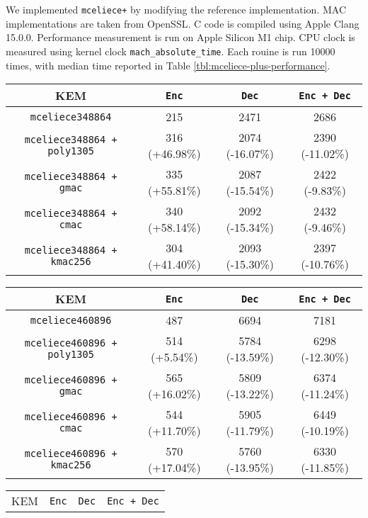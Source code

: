 \documentclass[runningheads]{llncs}
\begin{document}
We implemented \texttt{mceliece+} by modifying the reference implementation. MAC implementations are taken from OpenSSL. C code is compiled using Apple Clang 15.0.0. Performance measurement is run on Apple Silicon M1 chip. CPU clock is measured using kernel clock \texttt{mach\_absolute\_time}. Each rouine is run 10000 times, with median time reported in Table \ref{tbl:mceliece-plus-performance}.

\begin{table}[h]
    \centering
    \begin{tabular}[c]{|c|c|c|c|}
        \hline
        KEM & \texttt{Enc} & \texttt{Dec} & \texttt{Enc + Dec} \\
        \hline
        \texttt{mceliece348864} & 215 & 2471 & 2686 \\
        \hline
        \texttt{mceliece348864 + poly1305} & 316 (+46.98\%) & 2074 (-16.07\%) & 2390 (-11.02\%) \\
        \hline
        \texttt{mceliece348864 + gmac} & 335 (+55.81\%) & 2087 (-15.54\%) & 2422 (-9.83\%) \\
        \hline
        \texttt{mceliece348864 + cmac} & 340 (+58.14\%) & 2092 (-15.34\%) & 2432 (-9.46\%) \\
        \hline
        \texttt{mceliece348864 + kmac256} & 304 (+41.40\%) & 2093 (-15.30\%) & 2397 (-10.76\%) \\
        \hline
    \end{tabular}
    \begin{tabular}[c]{|c|c|c|c|}
        \hline
        KEM & \texttt{Enc} & \texttt{Dec} & \texttt{Enc + Dec} \\
        \hline
        \texttt{mceliece460896} & 487 & 6694 & 7181 \\
        \hline
        \texttt{mceliece460896 + poly1305} & 514 (+5.54\%) & 5784 (-13.59\%) & 6298 (-12.30\%) \\
        \hline
        \texttt{mceliece460896 + gmac} & 565 (+16.02\%) & 5809 (-13.22\%) & 6374 (-11.24\%) \\
        \hline
        \texttt{mceliece460896 + cmac} & 544 (+11.70\%) & 5905 (-11.79\%) & 6449 (-10.19\%) \\
        \hline
        \texttt{mceliece460896 + kmac256} & 570 (+17.04\%) & 5760 (-13.95\%) & 6330 (-11.85\%) \\
        \hline
    \end{tabular}
    \begin{tabular}[c]{|c|c|c|c|}
        \hline
        KEM & \texttt{Enc} & \texttt{Dec} & \texttt{Enc + Dec} \\

\end{tabular}
\end{table}
\end{document}
